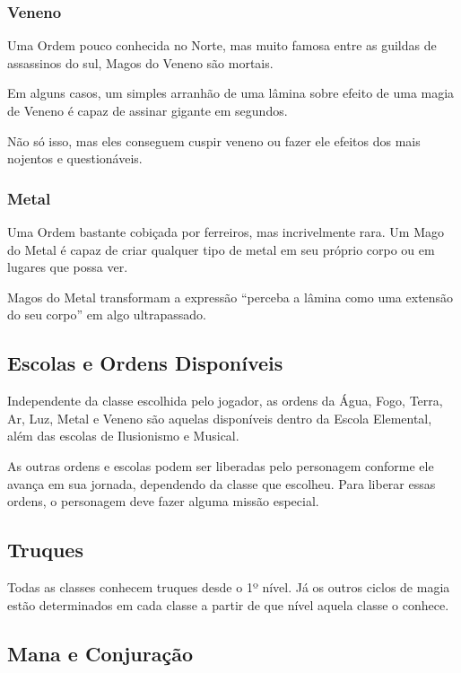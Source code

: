 \documentclass{RPG_Adventure}[2021/10/20]
\begin{document}
\subsubsection*{Veneno}%
\label{ssub:veneno}

Uma Ordem pouco conhecida no Norte, mas muito famosa entre as guildas de
assassinos do sul, Magos do Veneno são mortais.

Em alguns casos, um simples arranhão de uma lâmina sobre efeito de uma magia de
Veneno é capaz de assinar gigante em segundos.

Não só isso, mas eles conseguem cuspir veneno ou fazer ele efeitos dos mais
nojentos e questionáveis.

\subsubsection*{Metal}%
\label{ssub:metal}

Uma Ordem bastante cobiçada por ferreiros, mas incrivelmente rara. Um Mago do
Metal é capaz de criar qualquer tipo de metal em seu próprio corpo ou em lugares
que possa ver.

Magos do Metal transformam a expressão ``perceba a lâmina como uma extensão do
seu corpo'' em algo ultrapassado.

\subsection*{Escolas e Ordens Disponíveis}%
\label{sub:escolas_e_ordens_disponiveis}

Independente da classe escolhida pelo jogador, as ordens da Água, Fogo, Terra,
Ar, Luz, Metal e Veneno são aquelas disponíveis dentro da Escola Elemental, além
das escolas de Ilusionismo e Musical.

As outras ordens e escolas podem ser liberadas pelo personagem conforme ele
avança em sua jornada, dependendo da classe que escolheu. Para liberar essas
ordens, o personagem deve fazer alguma missão especial.

\subsection*{Truques}%
\label{sub:truques}

Todas as classes conhecem truques desde o 1º nível. Já os outros ciclos de magia
estão determinados em cada classe a partir de que nível aquela classe o conhece.

\subsection*{Mana e Conjuração}%
\label{sub:mana_e_conjuracao}
\end{document}
